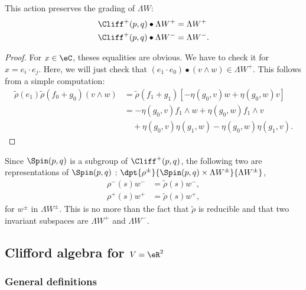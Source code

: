 \begin{proposition}
This action preserves the grading of $\Lambda W $:
\begin{equation}
\begin{split}
 \Cliff^+(p,q)\bullet\Lambda W^+&=\Lambda W^+\\
 \Cliff^+(p,q)\bullet\Lambda W^-&=\Lambda W^-.
\end{split}
\end{equation}

\end{proposition}
\begin{proof}
For $x\in\eC$, theses equalities are obvious. We have to check it for $x=e_i\cdot e_j$. Here, we will just check that $(e_1\cdot e_0)\bullet(v\wedge w)\in\Lambda W^+$. This follows from a simple computation:
\begin{equation}
\begin{split}
\tilde\rho(e_1)\tilde\rho(f_0+g_0)(v\wedge w)&=
                         \tilde\rho(f_1+g_1)\left[-\eta(g_0,v)w+\eta(g_0,w)v\right]\\
                    &=-\eta(g_0,v)f_1\wedge w+\eta(g_0,w)f_1\wedge v\\
                    &\quad+\eta(g_0,v)\eta(g_1,w)-\eta(g_0,w)\eta(g_1,v).
\end{split}
\end{equation}
\end{proof}

Since $\Spin(p,q)$ is a subgroup of $\Cliff^+(p,q)$, the following two are representations of \( \Spin(p,q)\) : $\dpt{\rho^{\pm}}{\Spin(p,q)\times\Lambda W ^{\pm}}{\Lambda W ^{\pm}}$,
\begin{equation}
\begin{split}
 \rho^-(s)w^-&=\tilde\rho(s)w^-,\\
 \rho^+(s)w^+&=\tilde\rho(s)w^+,
\end{split}
\end{equation}
for $w^{\pm}$ in $\Lambda W ^{\pm}$. This is no more than the fact that $\tilde\rho$ is reducible and that two invariant subspaces are $\Lambda W^+$ and $\Lambda W^-$.
\subsection{Clifford algebra for \texorpdfstring{$V=\eR^2$}{V=R2}}\label{cliffR2}

\subsubsection{General definitions}

